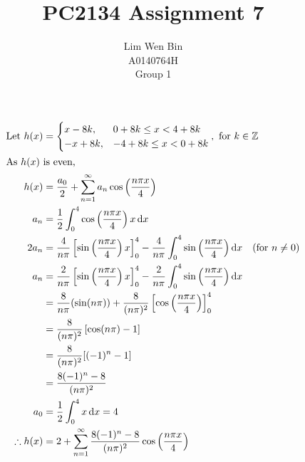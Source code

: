 \documentclass[12pt]{article}
\newcommand*\diff{\mathop{}\!\mathrm{d}}
\newcommand{\Z}{\mathbb{Z}}
\newenvironment{problem}[2][Problem]{\begin{trivlist}
\item[\hskip \labelsep {\bfseries #1}\hskip \labelsep {\bfseries #2.}]}{\end{trivlist}}
\begin{document}
\title{PC2134 Assignment 7}
\author{Lim Wen Bin \\
A0140764H\\
Group 1}
\maketitle

\begin{problem}{1.a}
\end{problem}
\begin{align*}
	\text{Let } h(x) &= \begin{cases}
		x - 8k, & 0 + 8k \le x < 4 + 8k \\
		-x + 8k, & -4 + 8k \le x < 0 + 8k \\
	\end{cases}, \text{ for $k \in \Z$} \\
	\intertext{As $h(x)$ is even,}
	h(x) &= \frac{a_0}{2} + \sum_{n=1}^\infty a_n \cos \left( \frac{n\pi x}{4} \right) \\
	a_n &= \frac{1}{2} \int_0^4 \cos \left( \frac{n\pi x}{4} \right) x \diff x \\ 
	2a_n &= \frac{4}{n\pi} \left[ \sin \left( \frac{n\pi x}{4} \right) x
		\right]_0^4 - \frac{4}{n\pi} \int_0^4 \sin \left( \frac{n\pi x}{4} \right) 
		\diff x \quad (\text{for } n \ne 0) \\ 
	a_n &= \frac{2}{n\pi} \left[ \sin \left( \frac{n\pi x}{4} \right) x
		\right]_0^4 - \frac{2}{n\pi} \int_0^4 \sin \left( \frac{n\pi x}{4} \right) 
		\diff x \\ 
	&= \frac{8}{n\pi} (\sin (n\pi)) + \frac{8}{(n\pi)^2}
		\left[ \cos \left( \frac{n\pi x}{4} \right) \right]_0^4 \\ 
	&= \frac{8}{(n\pi)^2} \left[ \cos (n\pi) - 1 \right] \\ 
	&= \frac{8}{(n\pi)^2} [(-1)^n - 1] \\ 
	&= \frac{8(-1)^n - 8}{(n\pi)^2} \\ 
	a_0 &= \frac{1}{2} \int_0^4 x \diff x = 4 \\
	\therefore h(x) &= 2 + \sum_{n=1}^\infty \frac{8(-1)^n - 8}{(n\pi)^2} \cos \left(
		\frac{n\pi x}{4} \right) \\
\end{align*}
\end{document}
